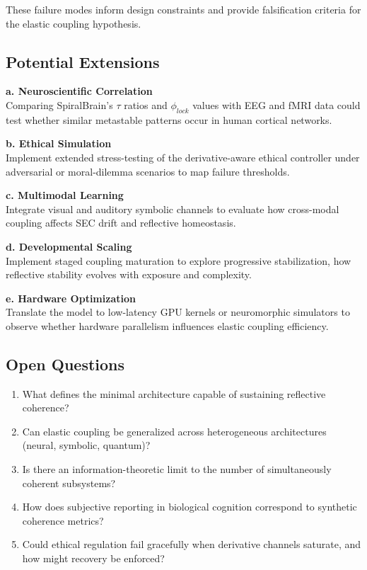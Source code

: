 \documentclass[11pt,a4paper]{article}
\begin{document}
These failure modes inform design constraints and provide falsification criteria for the elastic coupling hypothesis.

\subsection{Potential Extensions}

\textbf{a. Neuroscientific Correlation}\\
Comparing SpiralBrain's $\tau$ ratios and $\phi_{lock}$ values with EEG and fMRI data could test whether similar metastable patterns occur in human cortical networks.

\textbf{b. Ethical Simulation}\\
Implement extended stress-testing of the derivative-aware ethical controller under adversarial or moral-dilemma scenarios to map failure thresholds.

\textbf{c. Multimodal Learning}\\
Integrate visual and auditory symbolic channels to evaluate how cross-modal coupling affects SEC drift and reflective homeostasis.

\textbf{d. Developmental Scaling}\\
Implement staged coupling maturation to explore progressive stabilization, how reflective stability evolves with exposure and complexity.

\textbf{e. Hardware Optimization}\\
Translate the model to low-latency GPU kernels or neuromorphic simulators to observe whether hardware parallelism influences elastic coupling efficiency.

\subsection{Open Questions}

\begin{enumerate}
\item What defines the minimal architecture capable of sustaining reflective coherence?
\item Can elastic coupling be generalized across heterogeneous architectures (neural, symbolic, quantum)?
\item Is there an information-theoretic limit to the number of simultaneously coherent subsystems?
\item How does subjective reporting in biological cognition correspond to synthetic coherence metrics?
\item Could ethical regulation fail gracefully when derivative channels saturate, and how might recovery be enforced?
\end{enumerate}
\end{document}
